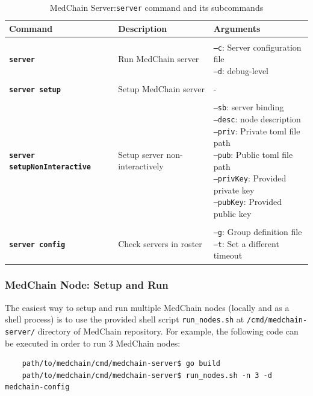 \begin{table}[ht]
\centering
\caption{MedChain Server:\texttt{server} command and its subcommands }
\label{tbl:server_cmds}
\begin{tabular}{|l|l|l|}
\hline
\textbf{Command} & \textbf{Description} & \textbf{Arguments}\\
\hline
\\[-1em]
\textbf{\texttt{server}}    &  Run MedChain server & \pbox{20cm}{\texttt{--c}: Server configuration file \\ \texttt{--d}: debug-level\\[1pt]}\\
\hline
\\[-1em]
\textbf{\texttt{server setup}}    &  Setup MedChain server & -\\
\hline
\\[-1em]
\textbf{\texttt{server setupNonInteractive}} & Setup server non-interactively  &  \pbox{20cm}{\texttt{--sb}: server binding \\ \texttt{--desc}: node description \\ \texttt{--priv}: Private toml file path \\ \texttt{--pub}: Public toml file path \\ \texttt{--privKey}: Provided private key \\ \texttt{--pubKey}: Provided public key \\[1pt]}\\
\hline
\\[-1em]
\textbf{\texttt{server config}} & Check servers in roster  & \pbox{20cm}{\texttt{--g}: Group definition file \\ \texttt{--t}: Set a different timeout\\[1pt]} \\
\hline
\end{tabular}
\end{table}


\subsubsection{MedChain Node: Setup and Run}
The easiest way to setup and run multiple MedChain nodes (locally and as a shell process) is to use the provided shell script \texttt{run\_nodes.sh} at \texttt{/cmd/medchain-server/} directory of MedChain repository. For example, the following code can be executed in order to run 3 MedChain nodes:
\begin{verbatim}
    path/to/medchain/cmd/medchain-server$ go build
    path/to/medchain/cmd/medchain-server$ run_nodes.sh -n 3 -d medchain-config
\end{verbatim}

